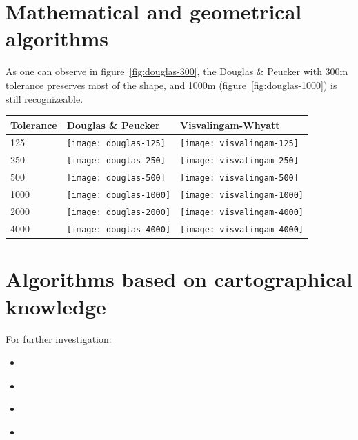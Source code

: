 \documentclass{article}
\begin{document}
\section{Mathematical and geometrical algorithms}

As one can observe in figure~\ref{fig:douglas-300}, the Douglas \& Peucker with
300m tolerance preserves most of the shape, and 1000m
(figure~\ref{fig:douglas-1000}) is still recognizeable.

\renewcommand{\tabularxcolumn}[1]{>{\center\small}m{#1}}
\begin{tabularx}{\textwidth}{ p{1.5cm} | X | X | }
    Tolerance                                            &
    Douglas \& Peucker                                   &
    Visvalingam-Whyatt                                   \tabularnewline \hline

    125                                                  &
    \texttt{[image: douglas-125]}      &
    \texttt{[image: visvalingam-125]}  \tabularnewline \hline

    250                                                  &
    \texttt{[image: douglas-250]}      &
    \texttt{[image: visvalingam-250]}  \tabularnewline \hline

    500                                                  &
    \texttt{[image: douglas-500]}      &
    \texttt{[image: visvalingam-500]}  \tabularnewline \hline

    1000                                                 &
    \texttt{[image: douglas-1000]}     &
    \texttt{[image: visvalingam-1000]} \tabularnewline \hline

    2000                                                 &
    \texttt{[image: douglas-2000]}     &
    \texttt{[image: visvalingam-4000]} \tabularnewline \hline

    4000                                                 &
    \texttt{[image: douglas-4000]}     &
    \texttt{[image: visvalingam-4000]} \tabularnewline \hline
\end{tabularx}

\section{Algorithms based on cartographical knowledge}

For further investigation:
\begin{itemize}
    \item \cite{jiang2003line}
    \item \cite{dyken2009simultaneous}
    \item \cite{mustafa2006dynamic}
    \item \cite{nollenburg2008morphing}
\end{itemize}
\end{document}
